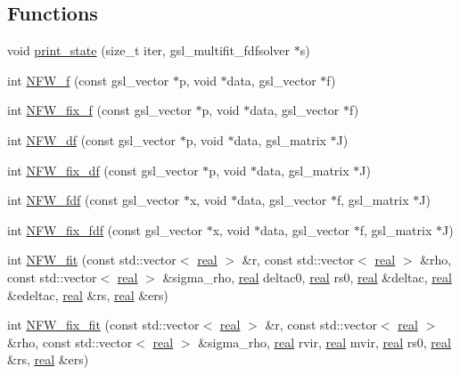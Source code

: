 \subsection*{Functions}
\begin{DoxyCompactItemize}
\item 
void \hyperlink{NFWFit_8h_aecabecd9aa15722cb046d129e06cd8f1}{print\_\-state} (size\_\-t iter, gsl\_\-multifit\_\-fdfsolver $\ast$s)
\item 
int \hyperlink{NFWFit_8h_a1ac3fd28f4c33bbdd041f20032d550ab}{NFW\_\-f} (const gsl\_\-vector $\ast$p, void $\ast$data, gsl\_\-vector $\ast$f)
\item 
int \hyperlink{NFWFit_8h_ae5a00852fa31030c15f761db6c0fffaf}{NFW\_\-fix\_\-f} (const gsl\_\-vector $\ast$p, void $\ast$data, gsl\_\-vector $\ast$f)
\item 
int \hyperlink{NFWFit_8h_af063c71a242be61173b55045d393d7d3}{NFW\_\-df} (const gsl\_\-vector $\ast$p, void $\ast$data, gsl\_\-matrix $\ast$J)
\item 
int \hyperlink{NFWFit_8h_aa2cccd6dba4f92be1466604b59ed62c3}{NFW\_\-fix\_\-df} (const gsl\_\-vector $\ast$p, void $\ast$data, gsl\_\-matrix $\ast$J)
\item 
int \hyperlink{NFWFit_8h_aa0c7a0983feb99926dac2c9a1782b548}{NFW\_\-fdf} (const gsl\_\-vector $\ast$x, void $\ast$data, gsl\_\-vector $\ast$f, gsl\_\-matrix $\ast$J)
\item 
int \hyperlink{NFWFit_8h_a32530cff0769cee40ebf88d4b49722db}{NFW\_\-fix\_\-fdf} (const gsl\_\-vector $\ast$x, void $\ast$data, gsl\_\-vector $\ast$f, gsl\_\-matrix $\ast$J)
\item 
int \hyperlink{NFWFit_8h_a29002cac08d9dde704e3e08ebdadb2da}{NFW\_\-fit} (const std::vector$<$ \hyperlink{Global_8h_a031f8951175b43076c2084a6c2173410}{real} $>$ \&r, const std::vector$<$ \hyperlink{Global_8h_a031f8951175b43076c2084a6c2173410}{real} $>$ \&rho, const std::vector$<$ \hyperlink{Global_8h_a031f8951175b43076c2084a6c2173410}{real} $>$ \&sigma\_\-rho, \hyperlink{Global_8h_a031f8951175b43076c2084a6c2173410}{real} deltac0, \hyperlink{Global_8h_a031f8951175b43076c2084a6c2173410}{real} rs0, \hyperlink{Global_8h_a031f8951175b43076c2084a6c2173410}{real} \&deltac, \hyperlink{Global_8h_a031f8951175b43076c2084a6c2173410}{real} \&edeltac, \hyperlink{Global_8h_a031f8951175b43076c2084a6c2173410}{real} \&rs, \hyperlink{Global_8h_a031f8951175b43076c2084a6c2173410}{real} \&ers)
\item 
int \hyperlink{NFWFit_8h_aa91c4fd9ac027504e75d7f3c44dced86}{NFW\_\-fix\_\-fit} (const std::vector$<$ \hyperlink{Global_8h_a031f8951175b43076c2084a6c2173410}{real} $>$ \&r, const std::vector$<$ \hyperlink{Global_8h_a031f8951175b43076c2084a6c2173410}{real} $>$ \&rho, const std::vector$<$ \hyperlink{Global_8h_a031f8951175b43076c2084a6c2173410}{real} $>$ \&sigma\_\-rho, \hyperlink{Global_8h_a031f8951175b43076c2084a6c2173410}{real} rvir, \hyperlink{Global_8h_a031f8951175b43076c2084a6c2173410}{real} mvir, \hyperlink{Global_8h_a031f8951175b43076c2084a6c2173410}{real} rs0, \hyperlink{Global_8h_a031f8951175b43076c2084a6c2173410}{real} \&rs, \hyperlink{Global_8h_a031f8951175b43076c2084a6c2173410}{real} \&ers)
\end{DoxyCompactItemize}


